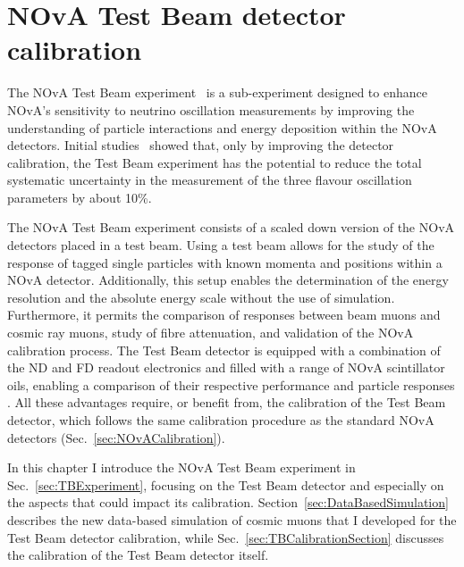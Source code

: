 \chapter{NOvA Test Beam detector calibration}\label{sec:TestBeamCalibration}

The \gls{NOvA} Test Beam experiment~\cite{NOvATestBeamWallbangProceedings2020.pdf} is a sub-experiment designed to enhance \gls{NOvA}'s sensitivity to neutrino oscillation measurements by improving the understanding of particle interactions and energy deposition within the \gls{NOvA} detectors. Initial studies~\cite{NOvA-doc-33012} showed that, only by improving the detector calibration, the Test Beam experiment has the potential to reduce the total systematic uncertainty in the measurement of the three flavour oscillation parameters by about 10\%.
 
The \gls{NOvA} Test Beam experiment consists of a scaled down version of the \gls{NOvA} detectors placed in a test beam. Using a test beam allows for the study of the response of tagged single particles with known momenta and positions within a \gls{NOvA} detector. Additionally, this setup enables the determination of the energy resolution and the absolute energy scale without the use of simulation. Furthermore, it permits the comparison of responses between beam muons and cosmic ray muons, study of fibre attenuation, and validation of the \gls{NOvA} calibration process. The Test Beam detector is equipped with a combination of the \gls{ND} and \gls{FD} readout electronics and filled with a range of \gls{NOvA} scintillator oils, enabling a comparison of their respective performance and particle responses \cite{NOvA-doc-15750}. All these advantages require, or benefit from, the calibration of the Test Beam detector, which follows the same calibration procedure as the standard \gls{NOvA} detectors (Sec.~\ref{sec:NOvACalibration}).

In this chapter I introduce the \gls{NOvA} Test Beam experiment in Sec.~\ref{sec:TBExperiment}, focusing on the Test Beam detector and especially on the aspects that could impact its calibration. Section~\ref{sec:DataBasedSimulation} describes the new data-based simulation of cosmic muons that I developed for the Test Beam detector calibration, while Sec.~\ref{sec:TBCalibrationSection} discusses the calibration of the Test Beam detector itself.

